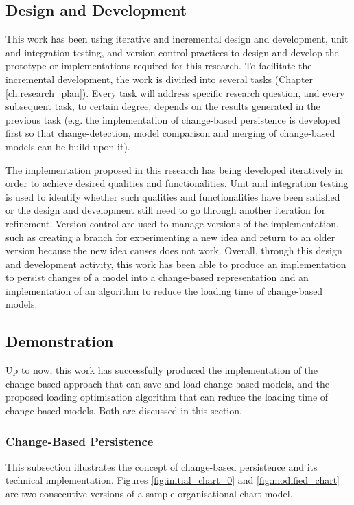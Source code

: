 \documentclass[12pt, a4paper]{report} \usepackage[titletoc]{appendix}
\begin{document}
\subsection{Design and Development}
\label{subsec:design_and_development}
This work has been using iterative and incremental design and development, unit and integration testing, and version control practices to design and develop the prototype or implementations required for this research. To facilitate the incremental development, the work is divided into several tasks (Chapter \ref{ch:research_plan}). Every task will address specific research question, and every subsequent task, to certain degree, depends on the results generated in the previous task (e.g. the implementation of change-based persistence is developed first so that change-detection, model comparison and merging of change-based models can be build upon it). 

The implementation proposed in this research has being developed iteratively in order to achieve desired qualities and functionalities. Unit and integration testing is used to identify whether such qualities and functionalities have been satisfied or the design and development still need to go through another iteration for refinement. Version control are used to manage versions of the implementation, such as creating a branch for experimenting a new idea and return to an older version because the new idea causes does not work. Overall, through this design and development activity, this work has been able to produce an implementation to persist changes of a model into a change-based representation and an implementation of an algorithm to reduce the loading time of change-based models.

\subsection{Demonstration}
\label{subsec:demonstration}
Up to now, this work has successfully produced the implementation of the change-based approach that can save and load change-based models, and the proposed loading optimisation algorithm that can reduce the loading time of change-based models. Both are discussed in this section. 

\subsubsection{Change-Based Persistence}
\label{change-based_persistence}
This subsection illustrates the concept of change-based persistence and its technical implementation. Figures \ref{fig:initial_chart_0} and \ref{fig:modified_chart} are two consecutive versions of a sample organisational chart model. 
\end{document}
